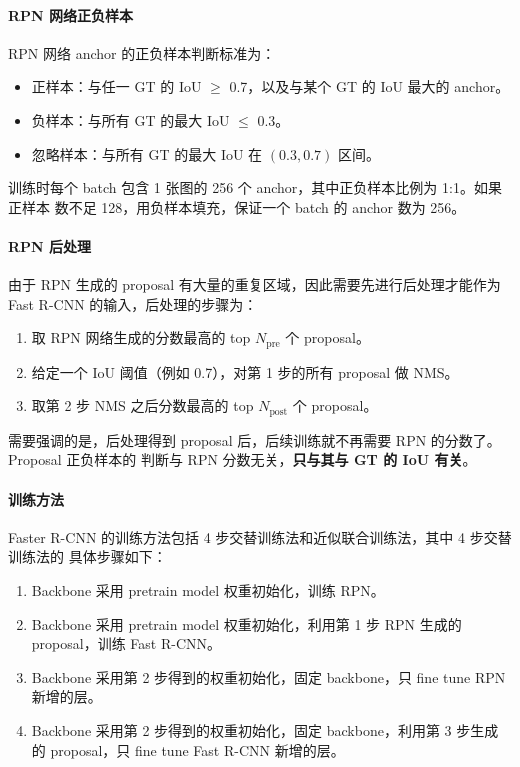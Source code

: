 \paragraph{RPN 网络正负样本}
RPN 网络 anchor 的正负样本判断标准为：

\begin{itemize}
  \item 正样本：与任一 GT 的 IoU $ \geq $ 0.7，以及与某个 GT 的 IoU 最大的 anchor。
  \item 负样本：与所有 GT 的最大 IoU $ \leq $ 0.3。
  \item 忽略样本：与所有 GT 的最大 IoU 在 $(0.3, 0.7)$ 区间。
\end{itemize}

训练时每个 batch 包含 1 张图的 256 个 anchor，其中正负样本比例为 1:1。如果正样本
数不足 128，用负样本填充，保证一个 batch 的 anchor 数为 256。

\paragraph{RPN 后处理}
由于 RPN 生成的 proposal 有大量的重复区域，因此需要先进行后处理才能作为 Fast
R-CNN 的输入，后处理的步骤为：

\begin{enumerate}
\item 取 RPN 网络生成的分数最高的 top $N_{\mathrm{pre}}$ 个 proposal。
\item 给定一个 IoU 阈值（例如 0.7），对第 1 步的所有 proposal 做 NMS。
\item 取第 2 步 NMS 之后分数最高的 top $N_{\mathrm{post}}$ 个 proposal。
\end{enumerate}

需要强调的是，后处理得到 proposal 后，后续训练就不再需要 RPN 的分数了。Proposal 正负样本的
判断与 RPN 分数无关，\textbf{只与其与 GT 的 IoU 有关}。

\paragraph{训练方法}

Faster R-CNN 的训练方法包括 4 步交替训练法和近似联合训练法，其中 4 步交替训练法的
具体步骤如下：

\begin{enumerate}
  \item Backbone 采用 pretrain model 权重初始化，训练 RPN。
  \item Backbone 采用 pretrain model 权重初始化，利用第 1 步 RPN 生成的 proposal，训练 Fast R-CNN。
  \item Backbone 采用第 2 步得到的权重初始化，固定 backbone，只 fine tune RPN 新增的层。
  \item Backbone 采用第 2 步得到的权重初始化，固定 backbone，利用第 3 步生成的
    proposal，只 fine tune Fast R-CNN 新增的层。
\end{enumerate}

